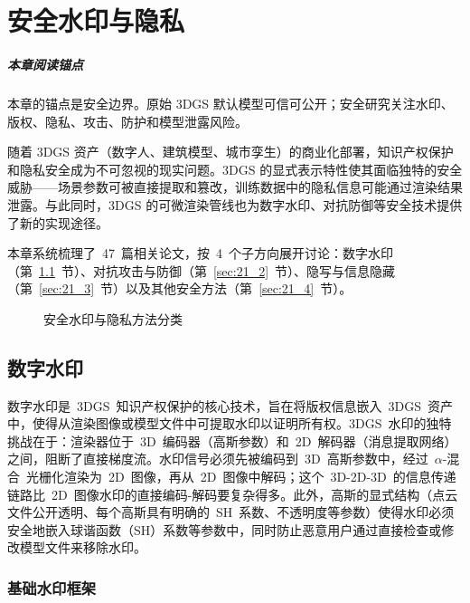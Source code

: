 \chapter{安全水印与隐私}
\label{ch:21}

\paragraph*{本章阅读锚点}
本章的锚点是安全边界。原始 3DGS 默认模型可信可公开；安全研究关注水印、版权、隐私、攻击、防护和模型泄露风险。


随着 3DGS 资产（数字人、建筑模型、城市孪生）的商业化部署，知识产权保护和隐私安全成为不可忽视的现实问题。3DGS 的显式表示特性使其面临独特的安全威胁——场景参数可被直接提取和篡改，训练数据中的隐私信息可能通过渲染结果泄露。与此同时，3DGS 的可微渲染管线也为数字水印、对抗防御等安全技术提供了新的实现途径。

本章系统梳理了~47~篇相关论文，按~4~个子方向展开讨论：数字水印（第~\ref{sec:21_1}~节）、对抗攻击与防御（第~\ref{sec:21_2}~节）、隐写与信息隐藏（第~\ref{sec:21_3}~节）以及其他安全方法（第~\ref{sec:21_4}~节）。

\begin{figure}[htbp]
\centering
\resizebox{\textwidth}{!}{}
\caption{安全水印与隐私方法分类}
\label{fig:ch21_security_taxonomy}
\end{figure}

\section{数字水印}
\label{sec:21_1}

数字水印是~3DGS~知识产权保护的核心技术，旨在将版权信息嵌入~3DGS~资产中，使得从渲染图像或模型文件中可提取水印以证明所有权。3DGS~水印的独特挑战在于：渲染器位于~3D~编码器（高斯参数）和~2D~解码器（消息提取网络）之间，阻断了直接梯度流。水印信号必须先被编码到~3D~高斯参数中，经过~$\alpha$-混合~光栅化渲染为~2D~图像，再从~2D~图像中解码；这个~3D-2D-3D~的信息传递链路比~2D~图像水印的直接编码-解码要复杂得多。此外，高斯的显式结构（点云文件公开透明、每个高斯具有明确的~SH~系数、不透明度等参数）使得水印必须安全地嵌入球谐函数（SH）系数等参数中，同时防止恶意用户通过直接检查或修改模型文件来移除水印。

\subsection{基础水印框架}

